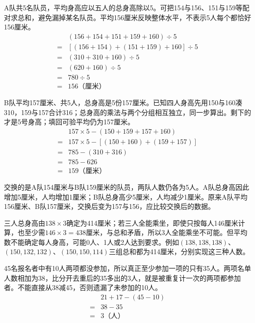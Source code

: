 \documentclass[multi=snippet,border=0pt]{standalone}
\newenvironment{snippet}[3]{\begin{minipage}{#1bp}\color{answerred}\fontsize{#2}{#3}\selectfont\raggedright}{\end{minipage}}
\begin{document}
\begin{snippet}{505}{11.5}{14}A队共5名队员，平均身高应以五人的总身高除以5。可把154与156、151与159等配对求总和，避免漏掉某名队员。平均156厘米反映整体水平，不表示5人每个都恰好156厘米。\[\begin{aligned}&(156+154+151+159+160)\div5\\={}&[(156+154)+(151+159)+160]\div5\\={}&(310+310+160)\div5\\={}&(620+160)\div5\\={}&780\div5\\={}&156\text{（厘米）}\end{aligned}\]\end{snippet}
\begin{snippet}{505}{11.5}{14}B队平均157厘米、共5人，总身高是5份157厘米。已知四人身高先用150与160凑310，159与157合计316；总身高的乘法与两个分组相互独立，同一步算出。剩下的才是5号身高；填回可验平均仍为157厘米。\[\begin{aligned}&157\times5-(150+159+157+160)\\={}&157\times5-[(150+160)+(159+157)]\\={}&785-(310+316)\\={}&785-626\\={}&159\text{（厘米）}\end{aligned}\]\end{snippet}
\begin{snippet}{505}{11.5}{14}交换的是A队154厘米与B队159厘米的队员，两队人数仍各为5人。A队总身高因此增加5厘米，人均增加1厘米；B队总身高少5厘米，人均减少1厘米。原来A队平均156厘米、B队157厘米，交换后变为157与156，应比较交换后的数据。\end{snippet}
\begin{snippet}{505}{11.5}{14}三人总身高由\(138\times3\)确定为414厘米；若三人全能乘坐，即使只按每人146厘米计算，也至少需\(146\times3=438\)厘米，与总和矛盾，所以3人全能乘坐不可能。但平均数不能确定每人身高，可能0人、1人或2人达到要求。例如\((138,138,138)\)、\((150,132,132)\)、\((150,150,114)\)三组总和都为414厘米，分别实现这三种人数。\end{snippet}
\begin{snippet}{505}{11.5}{14}45名报名者中有10人两项都没参加，所以真正至少参加一项的只有35人。两项名单人数相加为38，比分开去重后的35多出的3人，就是被重复计一次的两项都参加者。不能直接从38减45，否则遗漏了未参加的10人。\[\begin{aligned}&21+17-(45-10)\\={}&38-35\\={}&3\text{（人）}\end{aligned}\]\end{snippet}
\end{document}
